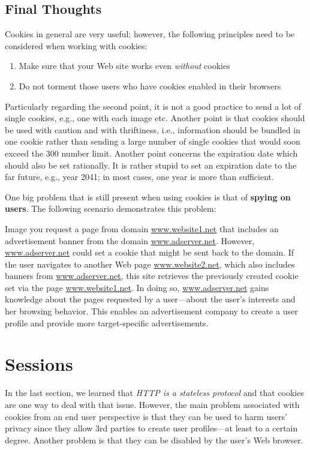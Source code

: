 \documentclass[a4paper, justified, notoc]{tufte-handout} %
\begin{document}
\subsection{Final Thoughts} %
\label{sub:final_thoughts}
Cookies in general are very useful; however, the following principles need to be considered when working with cookies:
\begin{enumerate}
	\item Make sure that your Web site works even \emph{without} cookies
	\item Do not torment those users who have cookies enabled in their browsers 
\end{enumerate}

Particularly regarding the second point, it is not a good practice to send a lot of single cookies, e.g., one with each image etc. Another point is that cookies should be used with caution and with thriftiness, i.e., information should be bundled in one cookie rather than sending a large number of single cookies that would soon exceed the 300 number limit. 
Another point concerns the expiration date which should also be set rationally. It is rather stupid to set an expiration date to the far future, e.g., year 2041; in most cases, one year is more than sufficient.

One big problem that is still present when using cookies is that of \textbf{spying on users}. The following scenario demonstrates this problem:
 
Image you request a page from domain \url{www.website1.net} that includes an advertisement banner from the domain \url{www.adserver.net}. However, \url{www.adserver.net} could set a cookie that might be sent back to the domain. 
If the user navigates to another Web page \url{www.website2.net}, which also includes banners from \url{www.adserver.net}, this site retrieves the previously created cookie set via the page \url{www.website1.net}.
In doing so, \url{www.adserver.net} gains knowledge about the pages requested by a user---about the user's interests and her browsing behavior. 
This enables an advertisement company to create a user profile and provide more target-specific advertisements.



\section{Sessions}%
\label{sec:sessions}
In the last section, we learned that \emph{HTTP is a stateless protocol} and that cookies are one way to deal with that issue.
However, the main problem associated with cookies from an end user perspective is that they can be used to harm users' privacy since they allow 3rd parties to create user profiles---at least to a certain degree. Another problem is that they can be disabled by the user's Web browser.
\end{document}
